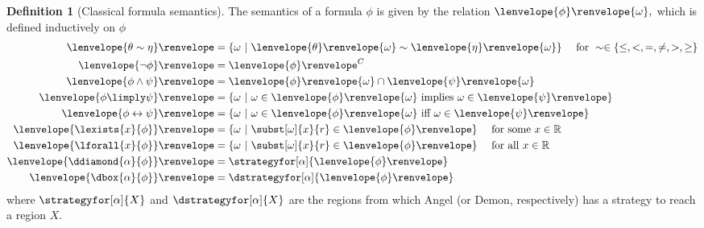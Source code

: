 \documentclass[12pt]{cmuthesis}
\theoremstyle{definition}
\newtheorem{definition}{Definition}
\theoremstyle{remark}
\newcommand{\lequiv}{\leftrightarrow}
\newcommand{\om}{\omega}
\newcommand{\tint}[2]{\lenvelope{#1}\renvelope{#2}}
\newcommand{\fint}[1]{\lenvelope{#1}\renvelope}
\begin{document}
\begin{definition}[Classical formula semantics]\label{def:dgl-sem-fml}
The semantics of a formula $\phi$ is given by the relation $\fint{\phi}{\om},$ which is defined inductively on $\phi$
\begin{align*}
\fint{\theta \sim \eta}  &= \{\om~|~\tint{\theta}{\om} \sim \tint{\eta}{\om}\}  \ \ \ \text{ for }\sim \in \{\leq,<,=,\neq,>,\geq\}\\
\fint{\neg \phi}         &= \fint{\phi}^C  \\
\fint{\phi \land \psi}   &= \fint{\phi}{\om} \cap \fint{\psi}{\om}\\
\fint{\phi \limply \psi} &= \{\om~|~ \om \in \fint{\phi}{\om} \text{ implies } \om \in \fint{\psi}\}\\
\fint{\phi \lequiv \psi} &= \{\om~|~ \om \in \fint{\phi}{\om} \text{ iff } \om \in \fint{\psi}\}\\
\fint{\lexists{x}{\phi}} &= \{\om~|~ \subst[\om]{x}{r} \in \fint{\phi}\}  \ \ \ \text{ for some }x \in \mathbb{R}\\
\fint{\lforall{x}{\phi}} &= \{\om~|~ \subst[\om]{x}{r} \in \fint{\phi}\}  \ \ \ \text{ for all }x \in \mathbb{R}\\
\fint{\ddiamond{\alpha}{\phi}} &=  \strategyfor[\alpha]{\fint{\phi}}\\
\fint{\dbox{\alpha}{\phi}} &= \dstrategyfor[\alpha]{\fint{\phi}}
\end{align*}
where $\strategyfor[\alpha]{X}$ and $\dstrategyfor[\alpha]{X}$ are the regions from which Angel (or Demon, respectively) has a strategy to reach a region $X$.
\end{definition}
\end{document}
